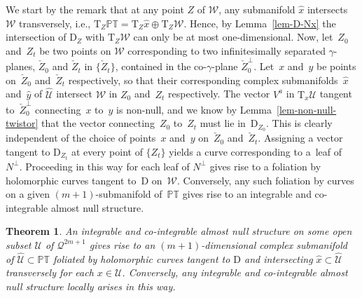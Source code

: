 \documentclass[pdftex]{sigma}
\numberwithin{equation}{section}
\newtheorem{Theorem}{Theorem}[section]
\newcommand{\mc} [1]{\mathcal{#1}}
\newcommand{\Drm} {{\mathrm{D}}}
\newcommand{\Tgt} {\mathrm{T}}
\newcommand{\PT} {\mathbb{PT}}
\begin{document}
We start by the remark that at any point $Z$ of $\mc{W}$, any submanifold $\hat{x}$ intersects $\mc{W}$ transversely, i.e., $\Tgt_Z \PT = \Tgt_Z \hat{x} \oplus \Tgt_Z \mc{W}$. Hence, by Lemma~\ref{lem-D-Nx} the intersection of $\Drm_Z$ with $\Tgt_Z \mc{W}$ can only be at most one-dimensional. Now, let~$Z_0$ and~$Z_t$ be two points on $\mc{W}$ corresponding to two inf\/initesimally separated $\gamma$-planes, $\check{Z}_0$ and $\check{Z}_t$ in $\{ \check{Z}_t \}$, contained in the co-$\gamma$-plane $\check{Z}^\perp_0$. Let~$x$ and~$y$ be points on~$\check{Z}_0$ and~$\check{Z}_t$ respectively, so that their corresponding complex subma\-ni\-folds~$\hat{x}$ and~$\hat{y}$ of $\widehat{\mc{U}}$ intersect $\mc{W}$ in $Z_0$ and~$Z_t$ respectively. The vector $V^a$ in $\Tgt_x \mc{U}$ tangent to~$\check{Z}^\perp_0$ connecting~$x$ to~$y$ is non-null, and we know by Lemma~\ref{lem-non-null-twistor} that the vector connecting~$Z_0$ to~$Z_t$ must lie in~$\mathrm{D}_{Z_0}$. This is clearly independent of the choice of points~$x$ and~$y$ on~$\check{Z}_0$ and~$\check{Z}_t$. Assigning a vector tangent to $\Drm_{Z_t}$ at every point of $\{ Z_t \}$ yields a curve corresponding to a~leaf of~$N^\perp$. Proceeding in this way for each leaf of $N^\perp$ gives rise to a foliation by holomorphic curves tangent to~$\Drm$ on~$\mc{W}$. Conversely, any such foliation by curves on a given $(m+1)$-submanifold of~$\PT$ gives rise to an integrable and co-integrable almost null structure.

\begin{Theorem}\label{thm-odd-Kerr-theorem-II}
An integrable and co-integrable almost null structure on some open subset $\mc{U}$ of $\mc{Q}^{2m+1}$ gives rise to an $(m+1)$-dimensional complex submanifold of $\widehat{\mc{U}} \subset \PT$ foliated by holomorphic curves tangent to $\mathrm{D}$ and intersecting $\hat{x} \subset \widehat{\mc{U}}$ transversely for each $x \in \mc{U}$. Conversely, any integrable and co-integrable almost null structure locally arises in this way.
\end{Theorem}
\end{document}
